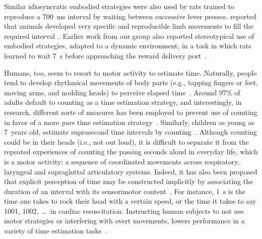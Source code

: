 Similar idiosyncratic embodied strategies were also used by rats trained to reproduce a 700~ms interval by waiting between successive lever presses.
 reported that animals developed very specific and reproducible limb movements to fill the required interval~\cite{Kawai2015}.
Earlier work from our group also reported stereotypical use of embodied strategies, adapted to a dynamic environment, in a task in which rats learned to wait 7~s before approaching the reward delivery port~\cite{Rueda2015NN}.
\par
Humans, too, seem to resort to motor activity to estimate time.
Naturally, people tend to develop rhythmical movements of body parts (e.g., tapping fingers or feet, moving arms, and nodding heads) to perceive elapsed time~\cite{Merchant2016CurrOp}.
Around 97\% of adults default to counting as a time estimation strategy, and interestingly, in research, different sorts of measures has been employed to prevent use of counting in favor of a more \textit{pure} time estimation strategy~\cite[see][]{Rattat2012}.
Similarly, children as young as 7~years old, estimate suprasecond time intervals by counting~\cite{Wilkening1987, Rakitin1998}.
Although counting could be in their heads (i.e., not out loud), it is difficult to separate it from the repeated experiences of counting the passing seconds aloud in everyday life, which is a motor activity:
    a sequence of coordinated movements across respiratory, laryngeal and supraglottal articulatory systems.
Indeed, it has also been proposed that explicit perception of time may be constructed implicitly by associating the duration of an interval with its sensorimotor content~\cite{Coull2018}.
For instance, 1~s is the time one takes to rock their head with a certain speed, or the time it takes to say 1001, 1002,~\ldots~in cardiac resuscitation.
Instructing human subjects to not use motor strategies or interfering with overt movements, lowers performance in a variety of time estimation tasks~\cite{Morillon2017PNAS, Wiener2019eNeuro, Meegan2000, Rakitin1998, Fautrelle2015PlosOne, Monier2019DevSci}.


